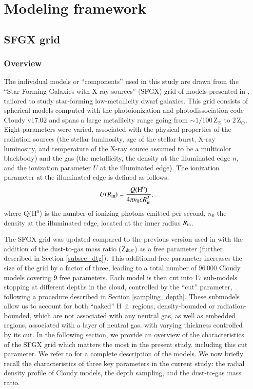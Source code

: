 \documentclass{aa}
\newcommand{\hii}{H~{\sc ii}}
\begin{document}
\section{Modeling framework}
\label{section_models}

\subsection{SFGX grid}

\subsubsection{Overview}
\label{subsect_sfgx}

The individual models or “components” used in this study are drawn from the “Star-Forming Galaxies with X-ray sources” (SFGX) grid of models presented in \cite{Ramambason2022}, tailored to study star-forming low-metallicity dwarf galaxies. This grid consists of spherical models computed with the photoionization and photodissociation code Cloudy v17.02 \citep{2017_Cloudy_v17} and spans a large metallicity range going from $\sim 1/100\,$Z$_{\odot}$ to 2\,Z$_{\odot}$. Eight parameters were varied, associated with the physical properties of the radiation sources (the stellar luminosity, age of the stellar burst, X-ray luminosity, and temperature of the X-ray source assumed to be a multicolor blackbody) and the gas (the metallicity, the density at the illuminated edge $n$, and the ionization parameter $U$ at the illuminated edge). The ionization parameter at the illuminated edge is defined as follows:
\begin{equation}
    U(R_{\rm in}) = \frac{Q({\rm H^0})}{4 \pi n_0 c R_{\rm in}^2},
\end{equation}
where Q(H$^0$) is the number of ionizing photons emitted per second, $n_0$ the density at the illuminated edge, located at the inner radius $R_{\rm in}$.

The SFGX grid was updated compared to the previous version used in \cite{Ramambason2022} with the addition of the dust-to-gas mass ratio (Z$_{\rm dust}$) as a free parameter (further described in Section \ref{subsec_dtg}).  This additional free parameter increases the size of the grid by a factor of three, leading to a total number of 96\,000 Cloudy models covering 9 free parameters.
Each model is then cut into 17 sub-models stopping at different depths in the cloud, controlled by the “cut” parameter, following a procedure described in Section \ref{sampling_depth}. These submodels allow us to account for both “naked” \hii\ regions, density-bounded or radiation-bounded, which are not associated with any neutral gas, as well as embedded regions, associated with a layer of neutral gas, with varying thickness controlled by its cut. In the following section, we provide an overview of the characteristics of the SFGX grid which matters the most in the present study, including this cut parameter. We refer to \cite{Ramambason2022} for a complete description of the models. We now briefly recall the characteristics of three key parameters in the current study: the radial density profile of Cloudy models, the depth sampling, and the dust-to-gas mass ratio.
\end{document}
